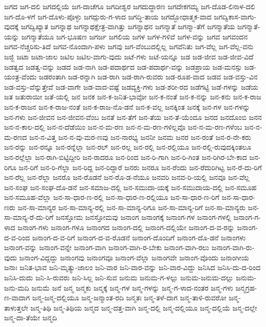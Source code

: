 {ಜಗದ
ಜಗ-ದಲಿ
ಜಗದಲ್ಲಿಯೆ
ಜಗ-ದಾಚೆಗೂ
ಜಗದೀಶ್ವರ
ಜಗದುದ್ಧಾರಣ
ಜಗದೇಕಗಮ್ಯ
ಜಗ-ದೊಡ-ಲಿನಾಳ-ದಲಿ
ಜಗ-ದೊ-ಳಗೆ
ಜಗ-ದೊಳು-ಪೊಳ್ಳು
ಜಗದ್ಗುರು-ಗ-ಳಾದ
ಜಗದ್ಧಿ-ತಾಯ
ಜಗದ್ಭೋಧಾತ್ಮಕ-ವಾದ
ಜಗದ್ವಿಕಾಸ-ವಾಗು-ವುದಕ್ಕೆ
ಜಗದ್ವಿಖ್ಯಾತ
ಜಗನ್ನಾಥ
ಜಗನ್ನಾಥಕ್ಷೇತ್ರ-ವಾಗಿತ್ತು
ಜಗನ್ನಾಥನ
ಜಗನ್ಮಾತೆ
ಜಗನ್ಮಾ-ತೆಗೆ
ಜಗನ್ಮಾತೆಯ
ಜಗನ್ಮಾತೆ-ಯನ್ನು
ಜಗನ್ಮಾತೆಯೂ
ಜಗ-ಭೂಷಣ
ಜಗರ್ಜ
ಜಗಲಿಯ
ಜಗಳ
ಜಗಳ-ಗಳಿವೆ
ಜಗಳ-ವನ್ನು
ಜಗವ
ಜಗವಂದನ
ಜಗವ-ನೆಚ್ಚರಿಸು-ತಿದೆ
ಜಗವ-ನೊಂದಾಗಿ-ಪಳು
ಜಗವು
ಜಗ-ವೆಂಬುದಲ್ಲಿಲ್ಲ
ಜಗವೆನಿತು
ಜಗ-ವೆಲ್ಲ
ಜಗ-ವೆಲ್ಲ-ವನು
ಜಜ್ಜಿ
ಜಟಾ
ಜಟಾ-ಜಾಲ
ಜಟಿಲ
ಜಟಿಲ-ವಾಗು-ವುದು
ಜಟೆ-ಗಳು
ಜಟೆ-ಯನ್ನೂ
ಜಡ
ಜಡ-ಜೀವ
ಜಡ-ಜೀವ-ವಿದೆ
ಜಡತ್ವದ
ಜಡತ್ವ-ವನ್ನು
ಜಡದ
ಜಡ-ನಾಗಿ
ಜಡ-ಪದಾರ್ಥದ
ಜಡ-ಪದಾರ್ಥ-ವನ್ನು
ಜಡಪ್ರಾಯ
ಜಡ-ಮನಸ್ಸು
ಜಡ-ಯಂತ್ರ-ವೆಂದು
ಜಡರಂತಾಗಿ
ಜಡ-ರನ್ನಾಗಿ
ಜಡ-ರಾಗಿ
ಜಡ-ರಾಗಿ-ರುವರು
ಜಡ-ರೂಪ-ವಾದ
ಜಡವ
ಜಡ-ವಸ್ತು-ವಿನ
ಜಡ-ವಸ್ತು-ವೆನ್ನುತ್ತೇವೆ
ಜಡ-ವಾಗೇ
ಜಡ-ವಾದ-ವಷ್ಟೆ
ಜಡವ್ಯಕ್ತಿ-ಗಳು
ಜಡ-ಶರೀ-ರದ
ಜಡೆಗಟ್ಟಿ
ಜಡೆ-ಗಳನ್ನು
ಜಡೆಯ
ಜತ
ಜತುರಾಯೀ
ಜತೆ-ಯಲ್ಲಿ
ಜನ
ಜನಕ
ಜನ-ಕ-ಜನಿತ-ಭಾವೋ
ಜನ-ಕ-ನಂತೆ
ಜನ-ಕ-ನನ್ನು
ಜನ-ಕನು
ಜನ-ಕ-ರಾಜ
ಜನ-ಕ-ರಾಜನ
ಜನ-ಕ-ರಾಜ-ನಂತೆ
ಜನ-ಕ-ರಾಜ-ನೊ-ಡನೆ
ಜನ-ಕ-ವಲ್ಲ
ಜನಕ್ಕಿಂತ
ಜನಕ್ಕೆ
ಜನ-ಗಳ
ಜನ-ಗಳನ್ನು
ಜನ-ಗಳು
ಜನ-ಜೀವನ
ಜನ-ಜೀವನ-ವೆಂಬ
ಜನತೆ
ಜನ-ತೆಗೆ
ಜನ-ತೆಯ
ಜನ-ತೆ-ಯೆಂದೂ
ಜನದ
ಜನದೊಂಬಿ
ಜನನ
ಜನ-ನ-ಕಾಲ-ದಲ್ಲಿ
ಜನ-ನ-ದೆಡೆಯಿಂ
ಜನ-ನ-ಮ-ರಣ
ಜನ-ನ-ಮ-ರಣ-ಗಳಿಲ್ಲವೊ
ಜನ-ನ-ಮ-ರಣ-ಗಳೆಂಬ
ಜನ-ನ-ಮ-ರಣದ
ಜನ-ನ-ವಿತ್ತ
ಜನ-ನ-ವು-ಮರ-ಣವು
ಜನ-ನಾರಭ್ಯ
ಜನನೀ
ಜನಮ
ಜನರ
ಜನ-ರಂತೆ
ಜನ-ರ-ನೇ-ಕರು
ಜನ-ರನ್ನು
ಜನ-ರನ್ನೂ
ಜನ-ರನ್ನೆಲ್ಲಾ
ಜನ-ರಲ್
ಜನ-ರಲ್ಲ
ಜನ-ರಲ್ಲಿ
ಜನ-ರಲ್ಲಿಯೂ
ಜನ-ರಲ್ಲಿ-ರುವುದಕ್ಕಿಂತಲೂ
ಜನ-ರಲ್ಲೆಲ್ಲಾ
ಜನ-ರಾಗಿ-ಬಿಟ್ಟಿದ್ದೀರಿ
ಜನ-ರಾದರೂ
ಜನ-ರಿಂದ
ಜನ-ರಿ-ಗಾಗಿ
ಜನ-ರಿ-ಗಿಂತ
ಜನ-ರಿಗಿರ-ಬೇ-ಕಾದ
ಜನ-ರಿಗೂ
ಜನ-ರಿಗೆ
ಜನ-ರಿ-ಗೆಲ್ಲಾ
ಜನ-ರಿದ್ದ
ಜನ-ರಿದ್ದಾರೆ
ಜನರು
ಜನರೂ
ಜನ-ರೆಂದು
ಜನ-ರೆದುರಿಗಿಟ್ಟ
ಜನ-ರೆ-ದು-ರಿಗೆ
ಜನ-ರೆಲ್ಲ
ಜನ-ರೆಲ್ಲಾ
ಜನರೊ
ಜನ-ರೊಡನೆ
ಜನ-ರೊ-ಡ-ನೆಯೂ
ಜನವರಿ
ಜನವ-ರಿ-ಯಲ್ಲಿ
ಜನವೂ
ಜನ-ವೆಲ್ಲ
ಜನ-ಸಂಘ
ಜನ-ಸಂಘ-ದೊ-ಡನೆ
ಜನ-ಸಮಾಜ-ದಲ್ಲಿ
ಜನ-ಸಮುದಾ-ಯಕ್ಕೆ
ಜನ-ಸಮುದಾಯ-ದಲ್ಲಿ
ಜನ-ಸಮೂಹ
ಜನ-ಸಮೂಹ-ವೆಲ್ಲಾ
ಜನ-ಸಾ-ಧಾರ-ಣ-ರಲ್ಲಿ
ಜನ-ಸಾ-ಧಾರ-ಣ-ರಲ್ಲಿಯೂ
ಜನ-ಸಾ-ಧಾರ-ಣ-ರಿಗೆ
ಜನ-ಸಾ-ಧಾರ-ಣರು
ಜನ-ಸಾ-ಮಾನ್ಯರ
ಜನ-ಸಾ-ಮಾನ್ಯ-ರಲ್ಲಿ
ಜನ-ಸಾ-ಮಾನ್ಯ-ರಿಗೂ
ಜನ-ಸಾ-ಮಾನ್ಯ-ರಿಗೆ
ಜನ-ಸಾ-ಮಾನ್ಯರು
ಜನ-ಸಾ-ಮಾನ್ಯ-ರೆ-ದು-ರಿಗೆ
ಜನಸ್ತೋಮ
ಜನಸ್ತೋಮವು
ಜನಾಂಗ
ಜನಾಂಗಕ್ಕೆ
ಜನಾಂಗ-ಗಳ
ಜನಾಂಗ-ಗಳಲ್ಲಿ
ಜನಾಂಗ-ಗ-ಳಾದ
ಜನಾಂಗ-ಗಳು
ಜನಾಂಗ-ಗಳೂ
ಜನಾಂಗದ
ಜನಾಂಗ-ದಲ್ಲಿ
ಜನಾಂಗ-ದಲ್ಲಿಯೇ
ಜನಾಂಗ-ದ-ವ-ರನ್ನು
ಜನಾಂಗ-ದ-ವ-ರಿಂದ
ಜನಾಂಗ-ದ-ವ-ರಿಗೆ
ಜನಾಂಗ-ದ-ವ-ರೊಡನೆ
ಜನಾಂಗ-ದೊಂದಿಗೆ
ಜನಾಂಗ-ದೊ-ಡನೆ
ಜನಾಂಗಳು
ಜನಾಂಗ-ವನ್ನು
ಜನಾಂಗ-ವನ್ನೇ
ಜನಾಂಗ-ವಾಗಿ
ಜನಾಂಗ-ವಾಗಿ-ರ-ಬೇಕು
ಜನಾಂಗ-ವಾಗಿ-ರಲು
ಜನಾಂಗ-ವಾಗಿ-ರು-ವುದು
ಜನಾಂಗ-ವಿದ್ದದ್ದು
ಜನಾಂಗವು
ಜನಾಂಗವೂ
ಜನಾಂಗ-ವೆಲ್ಲಾ
ಜನಾಂಗವೇ
ಜನಾಂಗ-ವೊಂದು
ಜನಾಂಗೀಯ
ಜನಾಃ
ಜನಿತ-ಭಾವ
ಜನಿ-ಮೃತ್ಯು-ಜಾಲಂ
ಜನಿ-ವಾರ
ಜನಿ-ವಾರ-ವನ್ನು
ಜನಿ-ವಾರ-ವಿದ್ದು
ಜನಿಸಿದ
ಜನಿಸಿ-ದು-ದ-ರಿಂದ
ಜನಿಸಿ-ದುದು
ಜನಿ-ಸಿ-ರುವರು
ಜನಿ-ಸಿಲ್ಲ
ಜನಿ-ಸುವ
ಜನುಮ
ಜನುಮ-ಗ-ಳಲ್ಲು
ಜನುಮ-ಜನುಮ-ದಲ್ಲು
ಜನುಮ-ಜನು-ಮದಿ
ಜನುಮೆ
ಜನೆ
ಜನ್ಮ
ಜನ್ಮಕು
ಜನ್ಮಕ್ಕೆ
ಜನ್ಮ-ಗಳ
ಜನ್ಮ-ಗಳನ್ನು
ಜನ್ಮ-ಗ-ಳಾದ-ನಂತರ
ಜನ್ಮ-ಗಳು
ಜನ್ಮಗ್ರಹ-ಣ-ವಾದಾಗ
ಜನ್ಮ-ಜನ್ಮ-ದಲ್ಲಿಯೂ
ಜನ್ಮ-ಜನ್ಮಾಂತ-ರದಿ
ಜನ್ಮತಃ
ಜನ್ಮ-ತಳೆ-ದಾಗ
ಜನ್ಮ-ತಾಳಿ-ರುವರೋ
ಜನ್ಮ-ತಾಳುತ್ತಲೇ
ಜನ್ಮ-ತಿಥಿ
ಜನ್ಮ-ತಿಥಿಯ
ಜನ್ಮದ
ಜನ್ಮ-ದತ್ತ-ವಾಗಿ
ಜನ್ಮ-ದಲ್ಲಿ
ಜನ್ಮ-ದಲ್ಲಿಯೂ
ಜನ್ಮ-ದಲ್ಲಿಯೆ
ಜನ್ಮ-ದಲ್ಲೇ
ಜನ್ಮ-ದಾ-ತೆಯೇ
ಜನ್ಮದಿ
}
